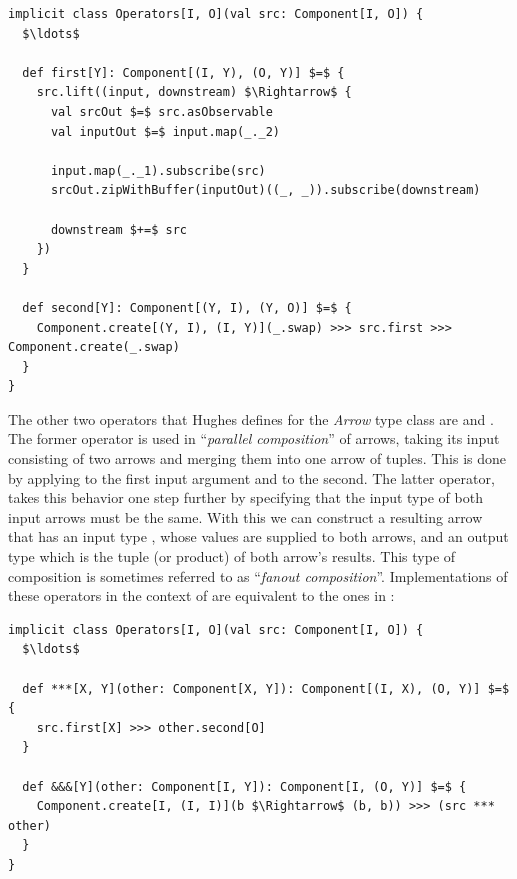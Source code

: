 \begin{minipage}{\linewidth}
\begin{lstlisting}[style=ScalaStyle, caption={Implementations of the \textit{Arrow}'s \code{first} and \code{second} operators}, label={lst:first-and-second}]
implicit class Operators[I, O](val src: Component[I, O]) {
  $\ldots$

  def first[Y]: Component[(I, Y), (O, Y)] $=$ {
    src.lift((input, downstream) $\Rightarrow$ {
      val srcOut $=$ src.asObservable
      val inputOut $=$ input.map(_._2)

      input.map(_._1).subscribe(src)
      srcOut.zipWithBuffer(inputOut)((_, _)).subscribe(downstream)

      downstream $+=$ src
    })
  }

  def second[Y]: Component[(Y, I), (Y, O)] $=$ {
    Component.create[(Y, I), (I, Y)](_.swap) >>> src.first >>> Component.create(_.swap)
  }
}
\end{lstlisting}
\end{minipage}

The other two operators that Hughes defines for the \textit{Arrow} type class are \code{(***)} and \code{(\&\&\&)}. The former operator is used in ``\textit{parallel composition}'' of arrows, taking its input consisting of two arrows and merging them into one arrow of tuples. This is done by applying  to the first input argument and  to the second. The latter operator, takes this behavior one step further by specifying that the input type of both input arrows must be the same. With this we can construct a resulting arrow that has an input type , whose values are supplied to both arrows, and an output type which is the tuple (or product) of both arrow's results. This type of composition is sometimes referred to as ``\textit{fanout composition}''. Implementations of these operators in the context of \comp are equivalent to the ones in :

\begin{minipage}{\linewidth}
\begin{lstlisting}[style=ScalaStyle, caption={Implementations of the \textit{Arrow}'s \code{(***)} and \code{(\&\&\&)} operators}, label={lst:parallel-and-fanout}]
implicit class Operators[I, O](val src: Component[I, O]) {
  $\ldots$

  def ***[X, Y](other: Component[X, Y]): Component[(I, X), (O, Y)] $=$ {
    src.first[X] >>> other.second[O]
  }

  def &&&[Y](other: Component[I, Y]): Component[I, (O, Y)] $=$ {
    Component.create[I, (I, I)](b $\Rightarrow$ (b, b)) >>> (src *** other)
  }
}
\end{lstlisting}
\end{minipage}

